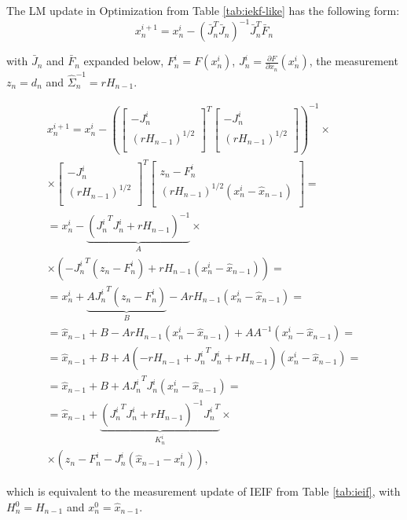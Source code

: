 The LM update in Optimization from Table \ref{tab:iekf-like} has the following form: 
\begin{equation}
    x_n^{i + 1}= x_n^{i} - (\bar{J}_n^T \bar{J}_n)^{-1} \bar{J}_n^T \bar{F}_n 
\end{equation}
 
 with $\bar{J}_n$ and $\bar{F}_n$ expanded below, $F_n^i = F(x_n^i)$, 
 $J_n^i = \frac{\partial F}{\partial x_n}(x_n^i)$, the measurement $z_n = d_n$ and $\hat{\Sigma}_n^{-1} = r H_{n - 1}$.
 
 \begin{align*}
x_n^{i + 1}= x_n^{i} - \left(
\left[
	\begin{array}{cc}
		- J_n^i \\
		\left(r H_{n - 1}\right)^{1/2} \\
	\end{array}
\right]^T 
\left[
	\begin{array}{c}
		- J_n^i \\
		\left(r H_{n - 1}\right)^{1/2} \\
	\end{array}
\right]
\right)^{-1} \times\\
\times \left[
	\begin{array}{cc}
		- J_n^i \\
		\left(r H_{n - 1}\right)^{1/2} \\
	\end{array}
\right]^T 
\left[
	\begin{array}{c}
		z_n - F_n^i \\
		\left(r H_{n - 1}\right)^{1/2}(x_n^i - \hat{x}_{n - 1}) \\
	\end{array}
\right] = \\
= x_n^{i} - \underbrace{\left({J_n^i}^T J_n^i + r H_{n - 1}\right)^{-1}}_{A} \times \\
\times \left( - {J_n^i}^T(z_n - F_n^i) + r H_{n - 1}(x_n^i - \hat{x}_{n - 1})\right)  = \\
= x_n^i +\underbrace{A {J_n^i}^T(z_n - F_n^i)}_B - A r H_{n - 1}(x_n^i - \hat{x}_{n - 1})  = \\
= \hat{x}_{n - 1} + B  - A r H_{n - 1}(x_n^i - \hat{x}_{n - 1}) + A A^{-1}( x_n^i - \hat{x}_{n - 1}) = \\
= \hat{x}_{n - 1} + B + A(- r H_{n - 1} + {J_n^i}^T J_n^i + r H_{n - 1})(x_n^i - \hat{x}_{n - 1}) = \\
= \hat{x}_{n - 1} + B + A {J_n^i}^T J_n^i (x_n^i - \hat{x}_{n - 1}) = \\
= \hat{x}_{n - 1} + \underbrace{\left({J_n^i}^T J_n^i + r H_{n - 1}\right)^{-1} {J_n^i}^T}_{K_n^i} \times \\
\times (z_n - F_n^i - J_n^i (\hat{x}_{n - 1} - x_n^i)),
 \end{align*}
 
 which is equivalent to the measurement update of IEIF from Table \ref{tab:ieif}, with $H_n^0 = H_{n-1}$ and $x_n^0 = \hat{x}_{n - 1}$.
